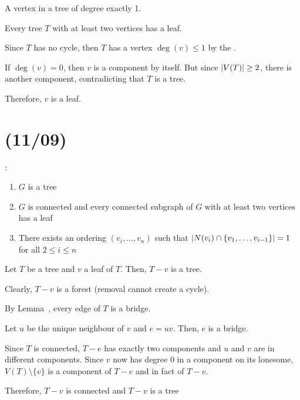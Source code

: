 \begin{defn}[leaf]
  A vertex in a tree of degree exactly 1.
\end{defn}

\begin{theorem}\label{thm:leafexist}
  Every tree $T$ with at least two vertices has a leaf.
\end{theorem}
\begin{sol}
  Since $T$ has no cycle, then $T$ has a vertex $\deg(v) \leq 1$ by
  the .

  If $\deg(v) = 0$, then $v$ is a component by itself.
  But since $\abs{V(T)} \geq 2$, there is another component,
  contradicting that $T$ is a tree.

  Therefore, $v$ is a leaf.
\end{sol}

\section{(11/09)}

\begin{theorem}
  \TFAE:
  \begin{enumerate}[(1),nosep]
    \item $G$ is a tree
    \item $G$ is connected and every connected subgraph of $G$
          with at least two vertices has a leaf
    \item There exists an ordering $(v_i,\dotsc,v_n)$ such that
          $\abs{N(v_i) \cap \{v_1,\dotsc,v_{i-1}\}} = 1$ for all $2 \leq i \leq n$
  \end{enumerate}
\end{theorem}

\begin{theorem}\label{thm:leafremove}
  Let $T$ be a tree and $v$ a leaf of $T$.
  Then, $T-v$ is a tree.
\end{theorem}
\begin{prf}
  Clearly, $T-v$ is a forest (removal cannot create a cycle).

  By Lemma~, every edge of $T$ is a bridge.

  Let $u$ be the unique neighbour of $v$ and $e=uv$.
  Then, $e$ is a bridge.

  Since $T$ is connected, $T-e$ has exactly two components
  and $u$ and $v$ are in different components.
  Since $v$ now has degree 0 in a component on its lonesome,
  $V(T) \setminus \{v\}$ is a component of $T-e$ and in fact of $T-v$.

  Therefore, $T-v$ is connected and $T-v$ is a tree
\end{prf}

